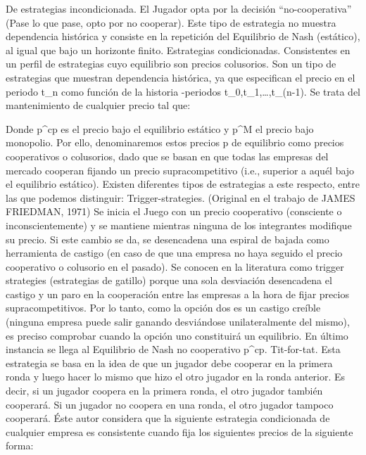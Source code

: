 \documentclass[10pt,a4paper]{article}
\begin{document}
De estrategias incondicionada. El Jugador opta por la decisión “no-cooperativa” (Pase lo que pase, opto por no cooperar). Este tipo de estrategia no muestra dependencia histórica y consiste en la repetición del Equilibrio de Nash (estático), al igual que bajo un horizonte finito. 
 Estrategias condicionadas. Consistentes en un perfil de estrategias cuyo equilibrio son precios colusorios. Son un tipo de estrategias que muestran dependencia histórica, ya que especifican el precio en el periodo t_n como función de la historia -periodos t_0,t_1,…,t_(n-1). Se trata del mantenimiento de cualquier precio tal que:
 
Donde p^cp es el precio bajo el equilibrio estático  y p^M el precio bajo monopolio. Por ello, denominaremos estos precios p de equilibrio como precios cooperativos o colusorios, dado que se basan en que todas las empresas del mercado cooperan fijando un precio supracompetitivo (i.e., superior a aquél bajo el equilibrio estático). Existen diferentes tipos de estrategias a este respecto, entre las que podemos distinguir:
	Trigger-strategies. (Original en el trabajo de JAMES FRIEDMAN, 1971) Se inicia el Juego con un precio cooperativo (consciente o inconscientemente) y se mantiene mientras ninguna de los integrantes modifique su precio. Si este cambio se da, se desencadena una espiral de bajada como herramienta de castigo (en caso de que una empresa no haya seguido el precio cooperativo o colusorio en el pasado). Se conocen en la literatura como trigger strategies (estrategias de gatillo) porque una sola desviación desencadena el castigo y un paro en la cooperación entre las empresas a la hora de fijar precios supracompetitivos.  Por lo tanto, como la opción dos es un castigo creíble (ninguna empresa puede salir ganando desviándose unilateralmente del mismo), es preciso comprobar cuando la opción uno constituirá un equilibrio. En último instancia se llega al Equilibrio de Nash no cooperativo p^cp.
	Tit-for-tat. Esta estrategia se basa en la idea de que un jugador debe cooperar en la primera ronda y luego hacer lo mismo que hizo el otro jugador en la ronda anterior. Es decir, si un jugador coopera en la primera ronda, el otro jugador también cooperará. Si un jugador no coopera en una ronda, el otro jugador tampoco cooperará. 
Éste autor considera que la siguiente estrategia condicionada de cualquier empresa es consistente cuando fija los siguientes precios de la siguiente forma:
\end{document}

